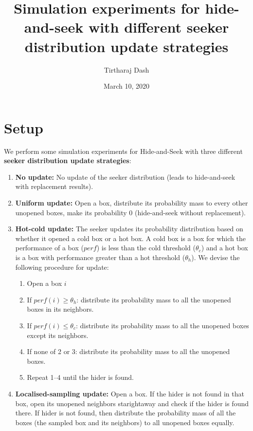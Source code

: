 \documentclass[11pt,a4paper,draft]{article}
\title{Simulation experiments for hide-and-seek with different seeker distribution update strategies}
\author{Tirtharaj Dash}
\date{March 10, 2020}
\begin{document}
\maketitle

\section{Setup}

\noindent
We perform some simulation experiments for Hide-and-Seek with three different \textbf{seeker distribution update strategies}:
\begin{enumerate}[(1)]
	\item\label{snoupd} \textbf{No update:} No update of the seeker distribution (leads to hide-and-seek with replacement results).
	\item\label{supdwor} \textbf{Uniform update:} Open a box, distribute its probability mass to every other unopened boxes, make its probability 0 (hide-and-seek without replacement).
	\item\label{supdhc} \textbf{Hot-cold update:} The seeker updates its probability distribution based on whether it opened a cold box or a hot box. A cold box is a box for which the performance of a box ($perf$) is less than the cold threshold ($\theta_c$) and a hot box is a box with performance greater than a hot threshold ($\theta_h$). We devise the following procedure for update:
	\begin{enumerate}[1.]
		\item Open a box $i$
		\item If $perf(i) \geq \theta_h$: distribute its probability mass to all the unopened boxes in its neighbors. 
		\item If $perf(i) \leq \theta_c$: distribute its probability mass to all the unopened boxes except its neighbors.
		\item If none of 2 or 3: distribute its probability mass to all the unopened boxes.
		\item Repeat 1--4 until the hider is found.
	\end{enumerate}
	\item\label{supdloc} \textbf{Localised-sampling update:} Open a box. If the hider is not found in that box, open its unopened neighbors starightaway and check if the hider is found there. If hider is not found, then distribute the probability mass of all the boxes (the sampled box and its neighbors) to all unopened boxes equally. 
\end{enumerate}
\end{document}
